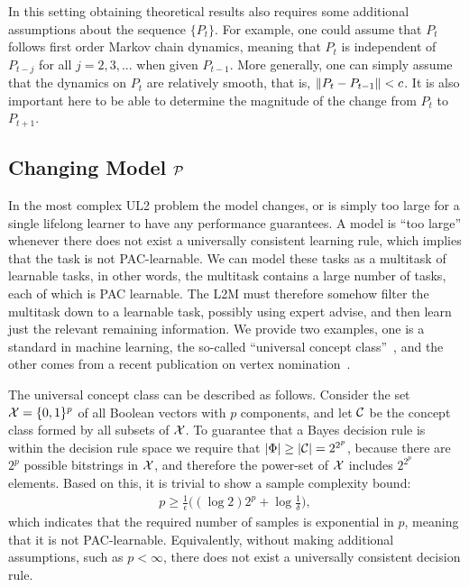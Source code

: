 \documentclass{article}
\begin{document}
In this setting obtaining theoretical results also requires some additional assumptions about the sequence $\{P_t\}$.
For example, one could assume that $P_t$ follows  first order Markov chain dynamics, meaning that $P_t$ is independent of $P_{t-j}$  for all $j=2,3,...$ when given $P_{t-1}$.  More generally, one can simply assume that the dynamics on $P_t$ are relatively smooth, that is, $\left \lVert P_t - P_{t-1} \right \rVert < c$. It is also important here to be able to determine the magnitude of the change from $P_t$ to $P_{t+1}$. 



\subsection{Changing Model $\mathcal{P}$}

In the most complex  UL2 problem  the model changes, or is simply too large for a single lifelong learner to have any performance guarantees. A model is ``too large'' whenever there does not exist a universally consistent learning rule, which implies that the task is not PAC-learnable. We can model these tasks as a multitask of learnable tasks, in other words, the multitask contains a large number of tasks, each of which is PAC learnable.  The L2M must therefore somehow filter the multitask down to a learnable task, possibly using expert advise, and then learn just the relevant remaining information.  We provide two examples, one is a standard in machine learning, the so-called ``universal concept class''~\cite{Mohri2012}, and the other comes from a recent publication on vertex nomination~\cite{Lyzinski2017}.  

The universal concept class can be described as follows.  Consider the set $\mathcal{X}=\{0,1\}^p$ of all Boolean vectors with $p$ components, and let $\mathcal{C}$ be the concept class formed by all subsets of $\mathcal{X}$.  To guarantee that a Bayes decision rule is within the decision rule space we require that $|\Phi| \geq |\mathcal{C}| = 2^{2^p}$, because there are $2^p$ possible bitstrings in $\mathcal{X}$, and therefore the power-set of $\mathcal{X}$ includes $2^{2^p}$ elements.  Based on this, it is trivial to show a sample complexity bound:
\begin{align}
    p \geq \frac{1}{\epsilon} \big(  (\log 2) 2^p + \log \frac{1}{\delta} \big),
\end{align}
which indicates that the required number of samples is exponential in $p$, meaning that it is not PAC-learnable.  Equivalently, without making additional assumptions, such as $p < \infty$, there does not exist a universally consistent decision rule. 
\end{document}
